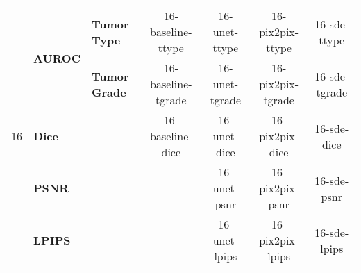 \begin{table}[]
\begin{tabular}{cll|cccc}
    \multirow{5}{*}{16}               & \multirow{2}{*}{\textbf{AUROC}} & \textbf{Tumor Type}  &   16-baseline-ttype       &   16-unet-ttype   &  16-pix2pix-ttype   &     16-sde-ttype     \\
                                     &                        & \textbf{Tumor Grade} &   16-baseline-tgrade       &   16-unet-tgrade   &  16-pix2pix-tgrade   &     16-sde-tgrade     \\ \cline{2-3}
                                     & \multicolumn{2}{l|}{\textbf{Dice}}            &  16-baseline-dice        &   16-unet-dice   &  16-pix2pix-dice   &     16-sde-dice     \\ \cline{2-3}
                                     & \multicolumn{2}{l|}{\textbf{PSNR}}            &   \cellcolor[HTML]{C0C0C0}      &   16-unet-psnr   &  16-pix2pix-psnr   &     16-sde-psnr     \\
                                     & \multicolumn{2}{l|}{\textbf{LPIPS}}           &   \cellcolor[HTML]{C0C0C0}       &   16-unet-lpips   &  16-pix2pix-lpips   &     16-sde-lpips     \\ \hline
    \end{tabular}
    \end{table}
